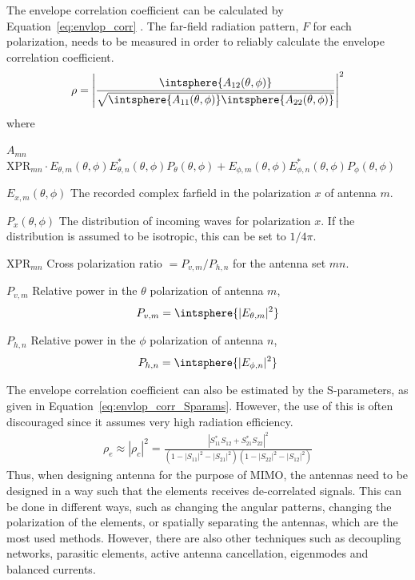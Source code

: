 The envelope correlation coefficient can be calculated by Equation~\ref{eq:envlop_corr} \cite{Wang2010}. The far-field radiation pattern, $F$ for each polarization, needs to be measured in order to reliably calculate the envelope correlation coefficient.
\begin{align} 
\label{eq:envlop_corr}
\rho = 
\left|  
%
\frac
{\intsphere{A_{12}(\theta,\phi)}}
{\sqrt{\intsphere{A_{11}(\theta,\phi)} \intsphere{A_{22}(\theta,\phi)}}}
%
\right|^2
\end{align}
where
\def\xpr{\text{XPR}}
\begin{where}
\item[$A_{mn}$]
    $
    \xpr_{mn} \cdot E_{\theta,m}(\theta,\phi) E^*_{\theta,n}(\theta,\phi) P_{\theta}(\theta,\phi)
    +
    E_{\phi,m}(\theta,\phi)E^*_{\phi,n}(\theta,\phi)P_{\phi}(\theta,\phi)
    $
\item[$E_{x,m}(\theta,\phi)$] The recorded complex farfield in the polarization $x$ of antenna $m$.
\item[$P_x(\theta,\phi)$] The distribution of incoming waves for polarization $x$. If the distribution is assumed to be isotropic, this can be set to $1/4\pi$.
\item[$\xpr_{mn}$] Cross polarization ratio $= P_{v,m}/P_{h,n}$ for the antenna set $mn$.
\item[$P_{v,m}$] Relative power in the $\theta$ polarization of antenna $m$, 
    \begin{equation*}
        P_{v,m} = \intsphere{|E_{\theta,m}|^2}
    \end{equation*}
\item[$P_{h,n}$] Relative power in the $\phi$ polarization of antenna $n$,
    \begin{equation*}
        P_{h,n} = \intsphere{|E_{\phi,n}|^2}
    \end{equation*}
\end{where}

The envelope correlation coefficient can also be estimated by the S-parameters, as given in Equation~\ref{eq:envlop_corr_Sparams}\cite{Alain2010MIMO}. However, the use of this is often discouraged since it assumes very high radiation efficiency. 
\begin{align}
\label{eq:envlop_corr_Sparams}
  \rho_e \approx |\rho_c|^2 = \frac{|S^*_{11}S_{12}+S^*_{21}S_{22}|^2}{(1-|S_{11}|^2-|S_{21}|^2)(1-|S_{22}|^2-|S_{12}|^2)}
\end{align}
Thus, when designing antenna for the purpose of MIMO, the antennas need to be designed in a way such that the elements receives de-correlated signals. This can be done in different ways, such as changing the angular patterns, changing the polarization of the elements, or spatially separating the antennas, which are the most used methods. However, there are also other techniques such as decoupling networks, parasitic elements, active antenna cancellation, eigenmodes and balanced currents. 


